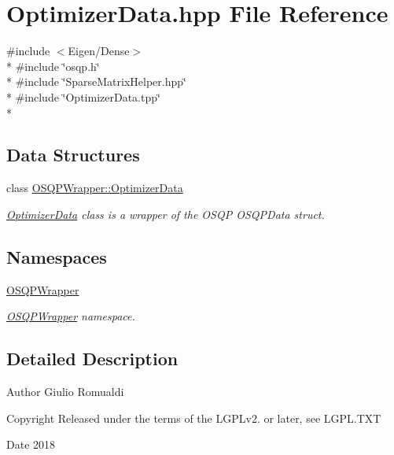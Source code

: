 \section{Optimizer\+Data.\+hpp File Reference}
\label{OptimizerData_8hpp}
{\ttfamily \#include $<$Eigen/\+Dense$>$}\\*
{\ttfamily \#include \char`\"{}osqp.\+h\char`\"{}}\\*
{\ttfamily \#include \char`\"{}Sparse\+Matrix\+Helper.\+hpp\char`\"{}}\\*
{\ttfamily \#include \char`\"{}Optimizer\+Data.\+tpp\char`\"{}}\\*
\subsection*{Data Structures}
\begin{DoxyCompactItemize}
\item 
class \hyperlink{classOSQPWrapper_1_1OptimizerData}{O\+S\+Q\+P\+Wrapper\+::\+Optimizer\+Data}
\begin{DoxyCompactList}\small\item\em \hyperlink{classOSQPWrapper_1_1OptimizerData}{Optimizer\+Data} class is a wrapper of the O\+S\+QP O\+S\+Q\+P\+Data struct. \end{DoxyCompactList}\end{DoxyCompactItemize}
\subsection*{Namespaces}
\begin{DoxyCompactItemize}
\item 
 \hyperlink{namespaceOSQPWrapper}{O\+S\+Q\+P\+Wrapper}
\begin{DoxyCompactList}\small\item\em \hyperlink{namespaceOSQPWrapper}{O\+S\+Q\+P\+Wrapper} namespace. \end{DoxyCompactList}\end{DoxyCompactItemize}


\subsection{Detailed Description}
\begin{DoxyAuthor}{Author}
Giulio Romualdi 
\end{DoxyAuthor}
\begin{DoxyCopyright}{Copyright}
Released under the terms of the L\+G\+P\+Lv2. or later, see L\+G\+P\+L.\+T\+XT 
\end{DoxyCopyright}
\begin{DoxyDate}{Date}
2018 
\end{DoxyDate}
